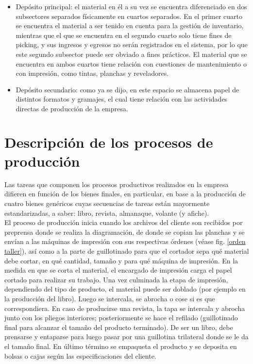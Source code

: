 \documentclass[a4paper, 12pt,twoside]{report}  %
\numberwithin{equation}{subsection} %
\begin{document}
 \begin{itemize}
 \item Depósito principal: el material en él a su vez se encuentra diferenciado en dos subsectores separados físicamente en cuartos separados. En el primer cuarto se encuentra el material a ser tenido en cuenta para la gestión de inventario, mientras que el que se encuentra en el segundo cuarto solo tiene fines de picking, y sus ingresos y egresos no serán registrados en el sistema, por lo que este segundo subsector puede ser obviado a fines prácticos. El material que se encuentra en ambos cuartos tiene relación con cuestiones de mantenimiento o con impresión, como tintas, planchas y reveladores.
\item Depósito secundario: como ya se dijo, en este espacio se almacena papel de distintos formatos y gramajes, el cual tiene relación con las actividades directas de producción de la empresa.
 \end{itemize}

 \section{Descripción de los procesos de producción}
 \label{Descripción de los procesos de producción}
 Las tareas que componen los procesos productivos realizados en la empresa difieren en función de los bienes finales, en particular, en base a la producción de cuatro bienes genéricos cuyas secuencias de tareas están mayormente estandarizadas, a saber: libro, revista, almanaque, volante (y afiche).\\
 \indent El proceso de producción inicia cuando los archivos del cliente son recibidos por preprensa donde se realiza la diagramación, de donde se copian las planchas y se envían a las máquinas de impresión con sus respectivas órdenes (véase fig. \ref{orden taller}), así como a la parte de guillotinado para que el cortador sepa qué material debe cortar, en qué cantidad, tamaño y para qué máquina de impresión. En la medida en que se corta el material, el encargado de impresión carga el papel cortado para realizar su trabajo. Una vez culminada la etapa de impresión, dependiendo del tipo de producto, el material puede ser doblado (por ejemplo en la producción del libro). Luego se intercala, se abrocha o cose si es que correspondiera. En caso de producirse una revista, la tapa se intercala y abrocha junto con los pliegos interiores; posteriormente se hace el refilado (guillotinado final para alcanzar el tamaño del producto terminado). De ser un libro, debe prensarse y entaparse para luego pasar por una guillotina trilateral donde se le da el tamaño final. En último término se empaqueta el producto y se deposita en bolsas o cajas según las especificaciones del cliente.
\end{document}
